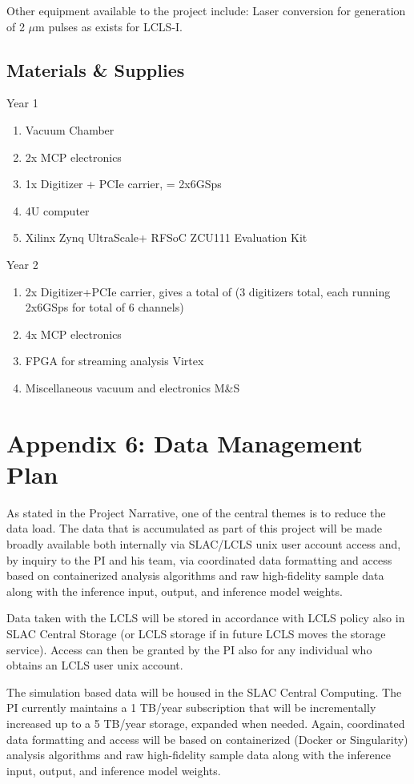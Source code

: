 \noindent Other equipment available to the project include:
Laser conversion for generation of 2 $\mu$m pulses as exists for LCLS-I.

\subsection*{Materials \& Supplies}
Year 1
\begin{enumerate}
\item Vacuum Chamber 
\item 2x MCP electronics 
\item 1x Digitizer + PCIe carrier, = 2x6GSps 
\item 4U computer 
\item Xilinx Zynq UltraScale+ RFSoC ZCU111 Evaluation Kit 
\end{enumerate}

\noindent Year 2
\begin{enumerate}
\item 2x Digitizer+PCIe carrier, gives a total of (3 digitizers total, each running 2x6GSps for total of 6 channels)
\item 4x MCP electronics 
\item FPGA for streaming analysis Virtex   
\item Miscellaneous vacuum and electronics M\&S 
\end{enumerate}

\clearpage
\appendix
\section*{Appendix 6: Data Management Plan}

As stated in the Project Narrative, one of the central themes is to reduce the data load.
The data that is accumulated as part of this project will be made broadly available both internally via SLAC/LCLS unix user account access and, by inquiry to the PI and his team, via coordinated data formatting and access based on containerized analysis algorithms and raw high-fidelity sample data along with the inference input, output, and inference model weights.

Data taken with the LCLS will be stored in accordance with LCLS policy also in SLAC Central Storage (or LCLS storage if in future LCLS moves the storage service).
Access can then be granted by the PI also for any individual who obtains an LCLS user unix account. 

The simulation based data will be housed in the SLAC Central Computing.  
The PI currently maintains a 1 TB/year subscription that will be incrementally increased up to a 5 TB/year storage, expanded when needed.
Again, coordinated data formatting and access will be based on containerized (Docker or Singularity) analysis algorithms and raw high-fidelity sample data along with the inference input, output, and inference model weights.
